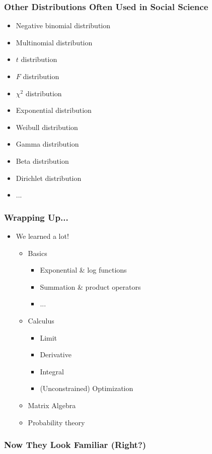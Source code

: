 \documentclass[pdflatex, 12pt]{beamer}
\begin{document}
\begin{frame}
\frametitle{Other Distributions Often Used in Social Science}
\begin{itemize}
\item Negative binomial distribution
\item Multinomial distribution
\item $t$ distribution
\item $F$ distribution
\item $\chi^2$ distribution
\item Exponential distribution
\item Weibull distribution
\item Gamma distribution
\item Beta distribution
\item Dirichlet distribution
\item ...
\end{itemize}
\end{frame}

\begin{frame}
\frametitle{Wrapping Up...}
\begin{itemize}
\item We learned a lot!
 \begin{itemize} 
 \item Basics
  \begin{itemize}
  \item Exponential \& log functions
  \item Summation \& product operators
  \item ...
  \end{itemize}
 \item Calculus
  \begin{itemize}
  \item Limit
  \item Derivative
  \item Integral
  \item (Unconstrained) Optimization
  \end{itemize}
 \item Matrix Algebra
 \item Probability theory
 \end{itemize}
\end{itemize}
\end{frame}

\begin{frame}
\frametitle{Now They Look Familiar (Right?)}
\centering
{}
\end{frame}
\end{document}
